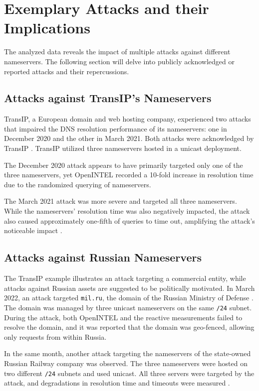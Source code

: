 \section{Exemplary Attacks and their Implications} \label{sec:observableattacksandtheirimplications}
The analyzed data reveals the impact of multiple attacks against different nameservers.
The following section will delve into publicly acknowledged or reported attacks and their repercussions.


\subsection{Attacks against TransIP's Nameservers} \label{subsec:attacksagainsttransipsnameservers}
TransIP, a European domain and web hosting company, experienced two attacks that impaired the DNS resolution performance of its nameservers: one in December 2020 and the other in March 2021.
Both attacks were acknowledged by TransIP \cite{transipddosdecember} \cite{transipddosmarch}.
TransIP utilized three nameservers hosted in a unicast deployment.

The December 2020 attack appears to have primarily targeted only one of the three nameservers, yet OpenINTEL recorded a 10-fold increase in resolution time due to the randomized querying of nameservers.

The March 2021 attack was more severe and targeted all three nameservers.
While the nameservers' resolution time was also negatively impacted, the attack also caused approximately one-fifth of queries to time out, amplifying the attack's noticeable impact \cite{Sommese2022DDoSDNS}.


\subsection{Attacks against Russian Nameservers} \label{subsec:attacksagainstrussiannameservers}
The TransIP example illustrates an attack targeting a commercial entity, while attacks against Russian assets are suggested to be politically motivated.
In March 2022, an attack targeted \texttt{mil.ru}, the domain of the Russian Ministry of Defense \cite{wiredrussiaddos}.
The domain was managed by three unicast nameservers on the same \texttt{/24} subnet.
During the attack, both OpenINTEL and the reactive measurements failed to resolve the domain, and it was reported that the domain was geo-fenced, allowing only requests from within Russia.

In the same month, another attack targeting the nameservers of the state-owned Russian Railway company was observed.
The three nameservers were hosted on two different \texttt{/24} subnets and used unicast.
All three servers were targeted by the attack, and degradations in resolution time and timeouts were measured \cite{Sommese2022DDoSDNS}.


